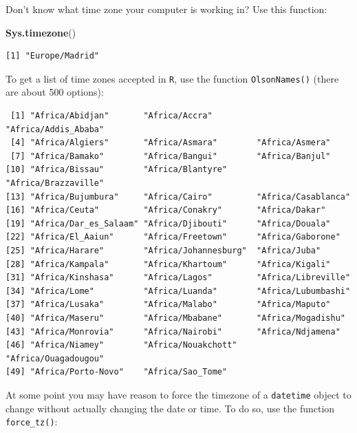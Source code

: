 \documentclass[]{book}
\newenvironment{Shaded}{\begin{snugshade}}{\end{snugshade}}
\newcommand{\DecValTok}[1]{\textcolor[rgb]{0.00,0.00,0.81}{#1}}
\newcommand{\KeywordTok}[1]{\textcolor[rgb]{0.13,0.29,0.53}{\textbf{#1}}}
\newcommand{\NormalTok}[1]{#1}
\newcommand{\OperatorTok}[1]{\textcolor[rgb]{0.81,0.36,0.00}{\textbf{#1}}}
\newcommand{\StringTok}[1]{\textcolor[rgb]{0.31,0.60,0.02}{#1}}
\begin{document}
Don't know what time zone your computer is working in? Use this function:

\begin{Shaded}
\begin{Highlighting}[]
\KeywordTok{Sys.timezone}\NormalTok{()}
\end{Highlighting}
\end{Shaded}

\begin{verbatim}
[1] "Europe/Madrid"
\end{verbatim}

To get a list of time zones accepted in \texttt{R}, use the function \texttt{OlsonNames()} (there are about 500 options):

\begin{Shaded}
\end{Shaded}

\begin{verbatim}
 [1] "Africa/Abidjan"       "Africa/Accra"         "Africa/Addis_Ababa"  
 [4] "Africa/Algiers"       "Africa/Asmara"        "Africa/Asmera"       
 [7] "Africa/Bamako"        "Africa/Bangui"        "Africa/Banjul"       
[10] "Africa/Bissau"        "Africa/Blantyre"      "Africa/Brazzaville"  
[13] "Africa/Bujumbura"     "Africa/Cairo"         "Africa/Casablanca"   
[16] "Africa/Ceuta"         "Africa/Conakry"       "Africa/Dakar"        
[19] "Africa/Dar_es_Salaam" "Africa/Djibouti"      "Africa/Douala"       
[22] "Africa/El_Aaiun"      "Africa/Freetown"      "Africa/Gaborone"     
[25] "Africa/Harare"        "Africa/Johannesburg"  "Africa/Juba"         
[28] "Africa/Kampala"       "Africa/Khartoum"      "Africa/Kigali"       
[31] "Africa/Kinshasa"      "Africa/Lagos"         "Africa/Libreville"   
[34] "Africa/Lome"          "Africa/Luanda"        "Africa/Lubumbashi"   
[37] "Africa/Lusaka"        "Africa/Malabo"        "Africa/Maputo"       
[40] "Africa/Maseru"        "Africa/Mbabane"       "Africa/Mogadishu"    
[43] "Africa/Monrovia"      "Africa/Nairobi"       "Africa/Ndjamena"     
[46] "Africa/Niamey"        "Africa/Nouakchott"    "Africa/Ouagadougou"  
[49] "Africa/Porto-Novo"    "Africa/Sao_Tome"     
\end{verbatim}

At some point you may have reason to force the timezone of a \texttt{datetime} object to change without actually changing the date or time. To do so, use the function \texttt{force\_tz()}:
\end{document}
